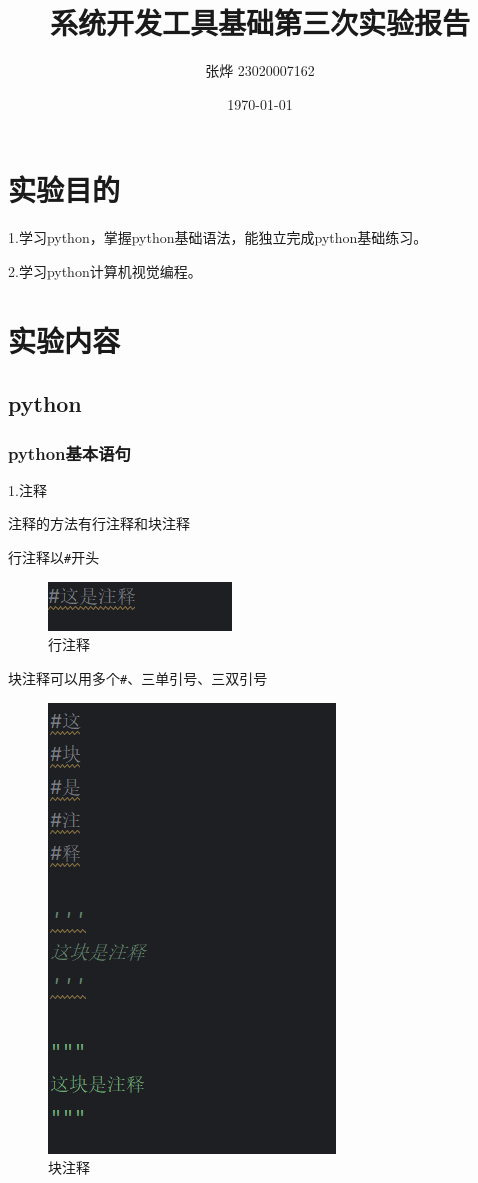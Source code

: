 \documentclass{ctexart}
\title{系统开发工具基础第三次实验报告}
\author{张烨 23020007162}
\date{\today}
\begin{document}
	\maketitle
	\tableofcontents
	\newpage
	\section{实验目的}
	1.学习python，掌握python基础语法，能独立完成python基础练习。
	
	2.学习python计算机视觉编程。
	\section{实验内容}
	\subsection{python}
	\subsubsection{python基本语句}
	1.注释
	
	注释的方法有行注释和块注释
	
	行注释以\verb|#|开头
	\begin{figure}[H]
		\centering
		\includegraphics{3.1}
		\caption{行注释}
	\end{figure}
	
	
	块注释可以用多个\verb|#|、三单引号、三双引号
	
	\begin{figure}[H]
		\centering
		\includegraphics[scale=0.5]{3.2}
		\caption{块注释}
	\end{figure}
	
\end{document}
